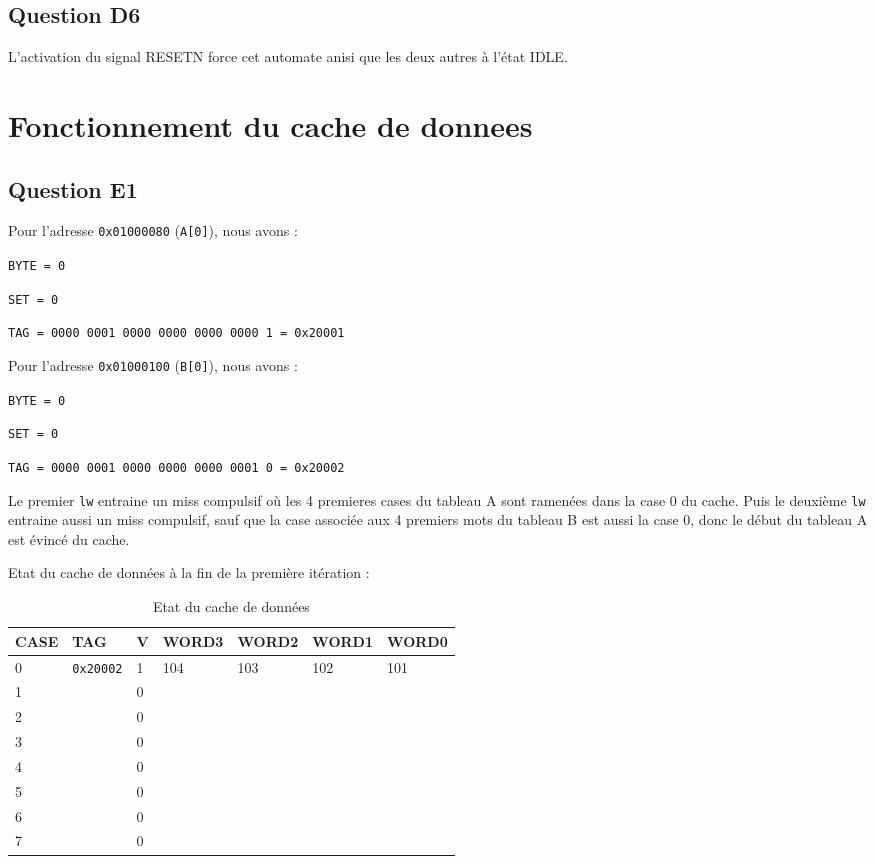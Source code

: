 \documentclass{article}
\begin{document}
\subsection{Question D6}

L'activation du signal RESETN force cet automate anisi que les deux autres
à l'état IDLE.


\section{Fonctionnement du cache de donnees}

\subsection{Question E1}

Pour l'adresse \texttt{0x01000080} (\texttt{A[0]}), nous avons :

\texttt{BYTE = 0} 

\texttt{SET = 0} 

\texttt{TAG = 0000 0001 0000 0000 0000 0000 1 = 0x20001}

Pour l'adresse \texttt{0x01000100} (\texttt{B[0]}), nous avons :

\texttt{BYTE = 0} 

\texttt{SET = 0} 

\texttt{TAG = 0000 0001 0000 0000 0000 0001 0 = 0x20002}

Le premier \texttt{lw} entraine un miss compulsif où les 4 premieres cases
du tableau A sont ramenées dans la case 0 du cache. Puis le deuxième
\texttt{lw} entraine aussi un miss compulsif, sauf que la case associée
aux 4 premiers mots du tableau B est aussi la case 0, donc le début du
tableau A est évincé du cache.

Etat du cache de données à la fin de la première itération :
\begin{table}[H]
\centering
\begingroup
\setlength{\tabcolsep}{5pt}
\renewcommand{\arraystretch}{1.1}
\begin{tabular}{| l | l | l | l | l | l | l |}

\hline
CASE & TAG & V & WORD3 & WORD2 & WORD1 & WORD0 \\
\hline
0 &\texttt{0x20002} & 1 & 104 & 103 & 102 & 101 \\ 
\hline
1&&0&&&&\\
\hline
2&&0&&&&\\
\hline
3&&0&&&&\\
\hline
4&&0&&&&\\
\hline
5&&0&&&&\\
\hline
6&&0&&&&\\
\hline
7&&0&&&&\\
\hline

\end{tabular}
\caption{Etat du cache de données}
\endgroup
\end{table}
\end{document}
